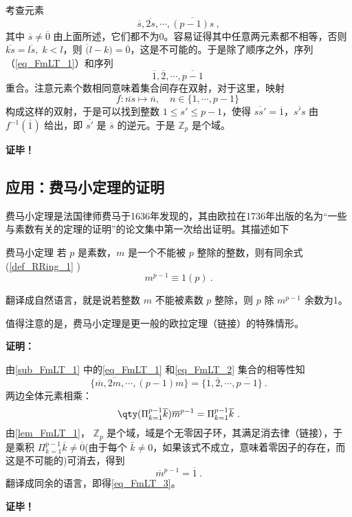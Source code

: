 考查元素 
\begin{equation}\label{eq_FmLT_1}
\overline s,\overline{2s},\cdots,\overline{(p-1)s}~,
\end{equation}
其中 $\overline s\not=\overline 0$ 由上面所述，它们都不为0。容易证得其中任意两元素都不相等，否则 $\overline{ks}=\overline{ls},\;k<l$，则 $\overline(l-k)=\overline 0$，这是不可能的。于是除了顺序之外，序列（\autoref{eq_FmLT_1}）和序列
\begin{equation}\label{eq_FmLT_2}
\overline 1,\overline 2,\cdots,\overline{p-1}~
\end{equation}
重合。注意元素个数相同意味着集合间存在双射，对于这里，映射
\begin{equation}
f:\overline{ns}\mapsto \overline n,\quad n\in\{1,\cdots,p-1\}~
\end{equation}
构成这样的双射，于是可以找到整数 $1\leq s'\leq p-1$，使得 $\overline{ss'}=\overline 1$，$\overline{s's}$ 由 $f^{-1}(\overline 1)$ 给出，即 $\overline{s'}$ 是 $\overline s$ 的逆元。于是 $\mathbb Z_p$ 是个域。

\textbf{证毕！}


\subsection{应用：费马小定理的证明}


费马小定理是法国律师费马于1636年发现的，其由欧拉在1736年出版的名为“一些与素数有关的定理的证明”的论文集中第一次给出证明。其描述如下
\begin{theorem}{费马小定理}\label{the_FmLT_1}
若 $p$ 是素数，$m$ 是一个不能被 $p$ 整除的整数，则有同余式(\autoref{def_RRing_1} )
\begin{equation}\label{eq_FmLT_3}
m^{p-1}\equiv 1(p)~.
\end{equation}
\end{theorem}
翻译成自然语言，就是说若整数 $m$ 不能被素数 $p$ 整除，则 $p$ 除 $m^{p-1}$ 余数为1。

值得注意的是，费马小定理是更一般的欧拉定理（链接）的特殊情形。

\textbf{证明：}

由\autoref{sub_FmLT_1} 中的\autoref{eq_FmLT_1} 和\autoref{eq_FmLT_2} 集合的相等性知
\begin{equation}
\{\overline m,\overline{2m},\cdots,\overline{(p-1)m}\}=\{\overline 1,\overline 2,\cdots,\overline{p-1}\}~.
\end{equation}
两边全体元素相乘：
\begin{equation}
\qty(\Pi_{k=1}^{p-1}\overline k)\overline{m}^{p-1}=\Pi_{k=1}^{p-1}\overline k~.
\end{equation}
由\autoref{lem_FmLT_1}， $\mathbb Z_p$ 是个域，域是个无零因子环，其满足消去律（链接），于是乘积 $\Pi_{k=1}^{p-1}\overline k\neq\overline0$(由于每个 $\bar k\neq0$，如果该式不成立，意味着零因子的存在，而这是不可能的)可消去，得到
\begin{equation}
\overline m^{p-1}=\overline 1~.
\end{equation}
翻译成同余的语言，即得\autoref{eq_FmLT_3}。


\textbf{证毕！}

